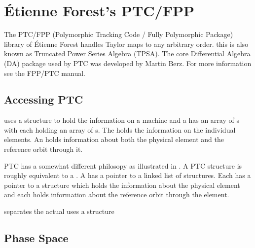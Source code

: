 \chapter{\'Etienne Forest's PTC/FPP}
\label{c:ptc}

The PTC/FPP (Polymorphic Tracking Code / Fully Polymorphic Package)
library of \'Etienne Forest handles Taylor maps to any arbitrary
order. this is also known as Truncated Power Series Algebra
(TPSA). The core Differential Algebra (DA) package used by PTC was
developed by Martin Berz\cite{b:berz}.  For more information see the
FPP/PTC manual\cite{b:ptc}. 

\section{Accessing PTC}
\label{s:ptc.structures}

\bmad uses a  structure to hold the information on a
machine and a  has an array of s with
each  holding an array of s. The
 holds the information on the individual elements. An
 holds information about both the physical element and
the reference orbit through it.

PTC has a somewhat different philosopy as illustrated in
. A PTC  structure is roughly equivalent
to a \bmad {}. A  has a pointer to a linked
list of  structures. Each  has a pointer to a
 structure which holds the information about the physical
element and each  holds information about the reference
orbit through the element.

separates the actual uses
a  structure

\section{Phase Space}
\label{s:ptc.space}

